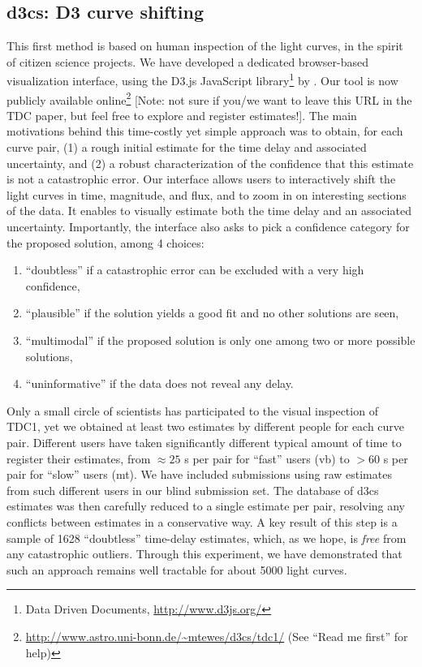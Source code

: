 \documentclass[traditabstract]{aa}
\begin{document}
\subsection{d3cs: D3 curve shifting}
This first method is based on human inspection of the light curves, in the spirit of citizen science projects. We have developed a dedicated browser-based visualization interface, using the D3.js JavaScript library\footnote{Data Driven Documents, \url{http://www.d3js.org/}} by \citet{d3}. Our tool is now publicly available online\footnote{\url{http://www.astro.uni-bonn.de/~mtewes/d3cs/tdc1/} (See ``Read me first'' for help)} [Note: not sure if you/we want to leave this URL in the TDC paper, but feel free to explore and register estimates!]. The main motivations behind this time-costly yet simple approach was to obtain, for each curve pair, (1) a rough initial estimate for the time delay and associated uncertainty, and (2) a robust characterization of the confidence that this estimate is not a catastrophic error. Our interface allows users to interactively shift the light curves in time, magnitude, and flux, and to zoom in on interesting sections of the data. It enables to visually estimate both the time delay and an associated uncertainty. Importantly, the interface also asks to pick a confidence category for the proposed solution, among 4 choices:
\begin{enumerate}
\item ``doubtless'' if a catastrophic error can be excluded with a very high confidence,
\item ``plausible'' if the solution yields a good fit and no other solutions are seen,
\item ``multimodal'' if the proposed solution is only one among two or more possible solutions,
\item ``uninformative'' if the data does not reveal any delay.
\end{enumerate}
Only a small circle of scientists has participated to the visual inspection of TDC1, yet we obtained at least two estimates by different people for each curve pair. Different users have taken significantly different typical amount of time to register their estimates, from $\approx 25$ s per pair for ``fast'' users (vb) to $> 60$ s per pair for ``slow'' users (mt). We have included submissions using raw estimates from such different users in our blind submission set. The database of d3cs estimates was then carefully reduced to a single estimate per pair, resolving any conflicts between estimates in a conservative way. A key result of this step is a sample of 1628 ``doubtless'' time-delay estimates, which, as we hope, is \emph{free} from any catastrophic outliers. Through this experiment, we have demonstrated that such an approach remains well tractable for about 5000 light curves.
\end{document}
